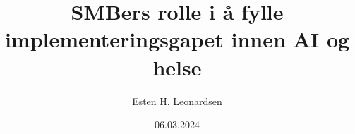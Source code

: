 \documentclass{beamer}
\title{SMBers rolle i å fylle implementeringsgapet innen AI og helse}
\author{Esten H. Leonardsen}
\date{06.03.2024}
\begin{document}
	\begin{frame}
	 	\titlepage
	\end{frame}

    \newcommand{\stickman}[2]{
        \node[circle,fill,minimum size=2.5mm,#2] (head) at #1 {};
        \node[rounded corners=1pt,minimum height=0.65cm,minimum width=0.2cm,fill,below = 0.5pt of head,#2] (body) {};
        \draw[line width=0.5mm,round cap-round cap,#2] ([shift={(1pt,-0.5pt)}]body.north east) --++(-90:3mm);
        \draw[line width=0.5mm,round cap-round cap,#2] ([shift={(-1pt,-0.5pt)}]body.north west)--++(-90:3mm);
        \draw[thick,white,-round cap] (body.south) --++(90:2.75mm);
    }


    \newcommand{\population}{
        \begin{tikzpicture}
            \node [
                double arrow,
                left color=blue,
                right color=red,
                double arrow head extend=0pt,
                transform shape,
                minimum height=1.5cm,
                text width=2.6cm,
                anchor=west
            ] at (-0.5, -1.25){};
            \node[font=\tiny, text=white] at (1.08, -1.25) {Symptomnivå};
            \stickman{(0, 0)}{blue}
            \stickman{(0.5, -0.1)}{blue}
            \stickman{(0.1, 1.1)}{blue}
            \stickman{(0.7, 1.05)}{blue}
            \stickman{(1.15, 0.1)}{blue}
            \stickman{(1.8, 0.2)}{blue!50!red}
            \stickman{(0.4, 2.2)}{blue!80!red}
            \stickman{(1.3, 1.4)}{blue!60!red}
            \stickman{(1.8, 2.2)}{blue!20!red}
            \stickman{(2.3, 1.2)}{blue!10!red}
        \end{tikzpicture}
    }
\end{document}
